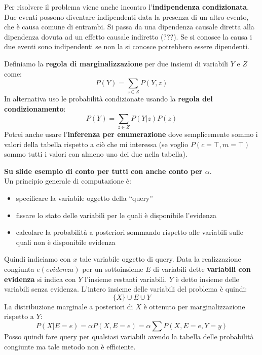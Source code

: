 \documentclass[a4paper,12pt, oneside]{book}
\begin{document}
Per risolvere il problema viene anche incontro l'\textbf{indipendenza
  condizionata}.\\
Due eventi possono diventare indipendenti data la presenza di un altro evento,
che è causa comune di entrambi. Si passa da una dipendenza causale diretta alla
dipendenza dovuta ad un effetto causale indiretto (???). Se si conosce la causa
i due eventi sono indipendenti se non la si conosce potrebbero essere
dipendenti.
\begin{definizione}
  Definiamo la \textbf{regola di marginalizzazione} per due insiemi di variabili
  $Y$ e $Z$ come:
  \[P(Y)=\sum_{z\in Z}P(Y,z)\]
  In alternativa uso le probabilità condizionate usando la \textbf{regola del
    condizionamento}:
  \[P(Y)=\sum_{z\in Z}P(Y|z)P(z)\]
  Potrei anche usare l'\textbf{inferenza per enumerazione} dove semplicemente
  sommo i valori della tabella rispetto a ciò che mi interessa (se voglio
  $P(c=\top,m=\top)$ sommo tutti i valori con almeno uno dei due nella tabella).
\end{definizione}
\textbf{Su slide esempio di conto per tutti con anche conto per $\alpha$}.\\
Un principio generale di computazione è:
\begin{itemize}
  \item specificare la variabile oggetto della ``query''
  \item fissare lo stato delle variabili per le quali è disponibile l'evidenza
  \item calcolare la probabilità a posteriori sommando
  rispetto alle variabili sulle quali non è disponibile evidenza 
\end{itemize}
Quindi indiciamo con $x$ tale variabile oggetto di query. Data la realizzazione
congiunta $e(evidenza)$ per un sottoinsieme $E$ di variabili dette
\textbf{variabili con evidenza} si indica con $Y$ l'insieme restanti
variabili. $Y$ è detto insieme delle variabili senza evidenza. L'intero insieme
delle variabili del problema è quindi:
\[\{X\}\cup E \cup Y\]
La distribuzione marginale a posteriori di $X$ è ottenuto per marginalizzazione
rispetto a $Y$:
\[P(X|E=e)=\alpha P(X,E=e)=\alpha\sum P(X,E=e,Y=y)\]
Posso quindi fare query per qualsiasi variabili avendo la tabella delle
probabilità congiunte ma tale metodo non è efficiente.
\end{document}

